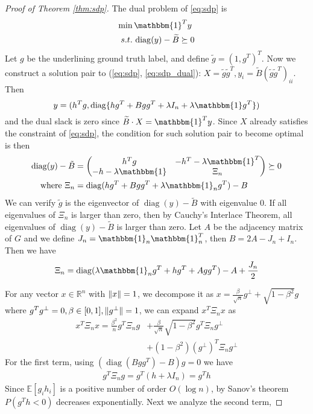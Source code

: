 \documentclass[conference]{IEEEtran}
\DeclarePairedDelimiter\norm{\lVert}{\rVert}
\DeclareMathOperator{\diag}{diag}
\begin{document}
	\begin{proof}[Proof of Theorem \ref{thm:sdp}]
		The dual problem of \eqref{eq:sdp} is
		\begin{align}
		\min\, & \mathbbm{1}^T y \notag \\
		s.t.\,& \diag(y) - \widetilde{B} \succeq 0
		\label{eq:sdp_dual}
		\end{align}
Let $g$ be the underlining ground truth label, and
define $\tilde{g} = (1,g^T)^T$.
Now we construct a solution pair to (\ref{eq:sdp}, \ref{eq:sdp_dual}): $X=\tilde{g}\tilde{g}^T, y_i = \tilde{B}(\tilde{g}\tilde{g}^T)_{ii}$.
Then $$
y = (h^T g, \diag\{hg^T+Bgg^T + \lambda I_n + \lambda \mathbbm{1}g^T\})
$$
and the dual slack is zero since $\widetilde{B} \cdot X = \mathbbm{1}^T y $.
Since $X$ already satisfies the constraint of \eqref{eq:sdp}, the condition for such solution pair to become optimal is then
\begin{align}
\diag(y) - \tilde{B} & = \begin{pmatrix} h^T g & -h^T - \lambda \mathbbm{1}^T \\ -h- \lambda \mathbbm{1} & \Xi_n \end{pmatrix}
\succeq 0 \notag \\
\textrm{ where }\Xi_n & = \diag(hg^T + Bgg^T + \lambda \mathbbm{1}_ng^T) - B
\end{align}
		We can verify $\tilde{g}$ is the eigenvector of $\diag(y) - \tilde{B}$ with eigenvalue $0$.
		If all eigenvalues of $\Xi_n$ is larger than zero, then by
		Cauchy’s Interlace Theorem, all eigenvalues of $\diag(y) - \tilde{B}$ is larger than zero.
		Let $A$ be the adjacency matrix of $G$
		and we define $J_n = \mathbbm{1}_n \mathbbm{1}_n^T $, then $B=2A-J_n+I_n$.
		Then we have
		\begin{equation}\label{eq:Xi_n}
		\Xi_n = \diag(\lambda \mathbbm{1}_n g^T + hg^T + Agg^T) - A + \frac{J_n}{2}
		\end{equation}
		
		For any vector $x \in \mathbb{R}^n$ with $\norm{x}=1$, we decompose it as $x=\frac{\beta}{\sqrt{n}} g^{\perp}
		+ \sqrt{1-\beta^2} g$ where $g^Tg^{\perp}=0, \beta \in [0,1], \norm{g^{\perp}}=1$, we can expand $x^T \Xi_n x$ as
		\begin{align*}
		x^T \Xi_n x = \frac{\beta^2}{n} g^T \Xi_n g  &+		\frac{\beta}{\sqrt{n}}\sqrt{1-\beta^2} g^T \Xi_n g^{\perp}
		 \\
		&+
		(1-\beta^2)(g^{\perp})^T \Xi_n g^{\perp} 
		\end{align*}
		For the first term, using $(\diag(Bgg^T) - B)g=0$ we have
		\begin{align*}
		g^T \Xi_n g = g^T(h+\lambda I_n) = g^T h
		\end{align*}
		Since $\mathbb{E}[g_ih_i]$ is a positive number of order $O(\log n)$, by Sanov's theorem
		$P(g^T h < 0)$ decreases exponentially. Next we analyze the second term,
		

\end{proof}
\end{document}
